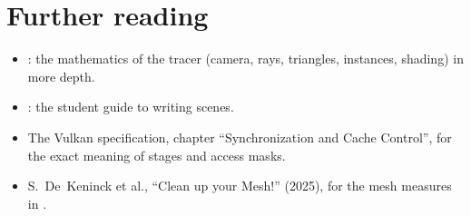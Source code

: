 \documentclass[11pt,a4paper]{article}
\begin{document}
\section{Further reading}

\begin{itemize}
  \item {}: the mathematics of the tracer (camera, rays, triangles, instances, shading) in more depth.
  \item {}: the student guide to writing scenes.
  \item The Vulkan specification, chapter ``Synchronization and Cache Control'', for the exact meaning of stages and access masks.
  \item S.~De~Keninck et al., ``Clean up your Mesh!'' (2025), for the mesh measures in .
\end{itemize}
\end{document}
